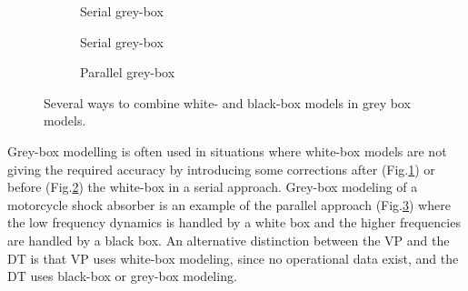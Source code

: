 \begin{figure}[H]
    \centering
    \begin{subfigure}[b]{0.3\textwidth}
    \centering
    \caption{Serial grey-box}
    \label{fig:serial1}
    \end{subfigure}

    
    \begin{subfigure}[b]{0.3\textwidth}
    \centering
    \caption{Serial grey-box}
    \label{fig:serial2}
    \end{subfigure}

    \begin{subfigure}[b]{0.3\textwidth}
    \centering
    \caption{Parallel grey-box}
    \label{fig:parallel}
    \end{subfigure}
    \caption{Several ways to combine white- and black-box models in grey box models.}
    \label{fig:greycombinations}
\end{figure}

\noindent Grey-box modelling is often used in situations where white-box models are not giving the required accuracy by introducing some corrections after (Fig.\ref{fig:serial1}) or before (Fig.\ref{fig:serial2}) the white-box in a serial approach. 
Grey-box modeling of a motorcycle shock absorber \cite{beghi_grey-box_2007} is an example of the parallel approach (Fig.\ref{fig:parallel}) where the low frequency dynamics is handled by a white box and the higher frequencies are handled by a black box.
An alternative distinction between the VP and the DT is that VP uses white-box modeling, since no operational data exist, and the DT uses  black-box or grey-box modeling.

